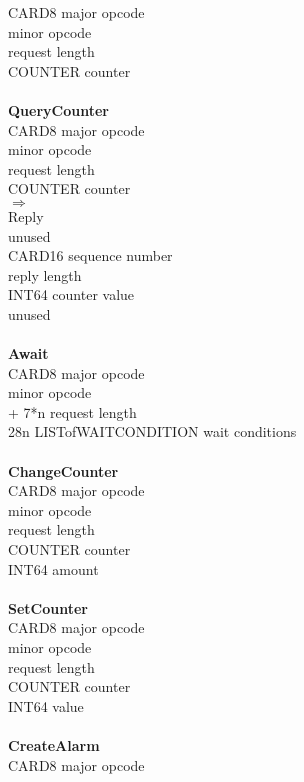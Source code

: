 \begin{tabbing}
		\> CARD8	\> major opcode \\
				\> minor opcode \\
	\> 2			\> request length \\
		\> COUNTER	\> counter\\
\\
{\bf QueryCounter}\\
		\> CARD8	\> major opcode \\
				\> minor opcode \\
	\> 2			\> request length \\
		\> COUNTER	\> counter \\
$\Rightarrow$\\
	\> 1			\> Reply \\
		\>		\> unused \\
		\> CARD16	\> sequence number \\
				\> reply length \\
		\> INT64	\> counter value \\
		\>		\> unused\\
\\
{\bf Await}\\
		\> CARD8	\> major opcode \\
				\> minor opcode \\
		 + 7*n	\> request length \\
	\> 28n	\> LISTofWAITCONDITION \> wait conditions\\
\\
{\bf ChangeCounter}\\
		\> CARD8	\> major opcode \\
				\> minor opcode \\
				\> request length \\
		\> COUNTER	\> counter \\
		\> INT64	\> amount \\
\\
{\bf SetCounter}\\
		\> CARD8	\> major opcode \\
				\> minor opcode \\
				\> request length \\
		\> COUNTER	\> counter \\
		\> INT64	\> value \\
\\
{\bf CreateAlarm}\\
		\> CARD8	\> major opcode \\

\end{tabbing}
